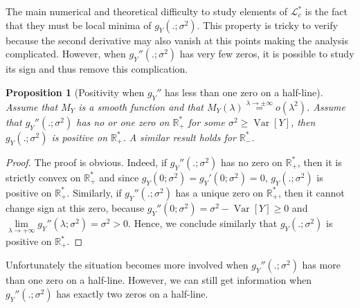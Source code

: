 \documentclass[a4paper, 10pt]{article}
\newtheorem{proposition}{Proposition}[section]
\theoremstyle{definition}
\begin{document}
The main numerical and theoretical difficulty to study elements of $\mathcal{L}_c^*$ is the fact that they must be local minima of $g_Y(.;\sigma^2)$. This property is tricky to verify because the second derivative may also vanish at this points making the analysis complicated. However, when $g_Y''(.;\sigma^2)$ has very few zeros, it is possible to study its sign and thus remove this complication.  

\begin{proposition}[Positivity when $g_Y''$ has less than one zero on a half-line]\label{Prop01Zeros} Assume that $M_Y$ is a smooth function and that $M_Y(\lambda)\overset{\lambda\to \pm\infty}{=}o(\lambda^2)$. Assume that $g_Y''(.;\sigma^2)$ has no or one zero on $\mathbb{R}_+^*$ for some $\sigma^2\geq \operatorname{Var}[Y]$, then $g_Y(.;\sigma^2)$ is positive on $\mathbb{R}_+^*$. A similar result holds for $\mathbb{R}_-^*$.
\end{proposition}

\begin{proof} The proof is obvious. Indeed, if $g_Y''(.;\sigma^2)$ has no zero on $\mathbb{R}_+^*$, then it is strictly convex on $\mathbb{R}_+^*$ and since $g_Y(0;\sigma^2)=g_Y'(0;\sigma^2)=0$, $g_Y(.;\sigma^2)$ is positive on $\mathbb{R}_+^*$. Similarly, if $g_Y''(.;\sigma^2)$ has a unique zero on $\mathbb{R}_+^*$, then it cannot change sign at this zero, because $g_Y''(0;\sigma^2)=\sigma^2-\operatorname{Var}[Y]\geq 0$ and $\underset{\lambda\to +\infty}{\lim}g_Y''(\lambda;\sigma^2)=\sigma^2>0$. Hence, we conclude similarly that $g_Y(.;\sigma^2)$ is positive on $\mathbb{R}_+^*$. 
\end{proof}

Unfortunately the situation becomes more involved when $g_Y''(.;\sigma^2)$ has more than one zero on a half-line. However, we can still get information when $g_Y''(.;\sigma^2)$ has exactly two zeros on a half-line.
\end{document}
